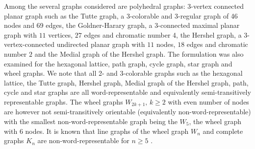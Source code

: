 \documentclass{article}
\begin{document}
Among the several graphs considered are polyhedral graphs: 3-vertex connected planar graph such as the Tutte graph, a 3-colorable and 3-regular graph of 46 nodes and 69 edges, the Goldner-Harary graph, a 3-connected maximal planar graph with $11$ vertices, $27$ edges and chromatic number 4, the Hershel graph, a 3-vertex-connected undirected planar graph with $11$ nodes, $18$ edges and chromatic number $2$ and the Medial graph of the Hershel graph.  The formulation was also examined for the hexagonal lattice, path graph, cycle graph, star graph and wheel graphs. We note that all 2- and 3-colorable graphs such as the hexagonal lattice, the Tutte graph, Hershel graph, Medial graph of the Hershel graph, path, cycle and star graphs are all word-representable and equivalently semi-transitively representable graphs. The wheel graphs $W_{2k+1},\, k\geq 2$ with even number of nodes are however not semi-transitively orientable (equivalently non-word-representable) with the smallest non-word-representable graph being the $W_{5}$, the wheel graph with $6$ nodes. It is known that line graphs of the wheel graph $W_{n}$ and complete graphs $K_{n}$ are non-word-representable for $n\geq 5$ \cite{line_graph}.
\end{document}
